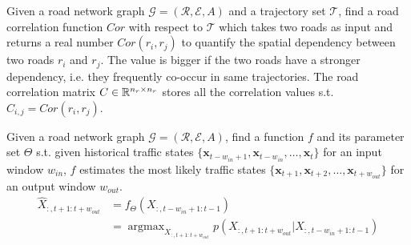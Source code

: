 \begin{problem}
    Given a road network graph $\mathcal{G}=(\mathcal{R}, \mathcal{E}, A)$ and a trajectory set $\mathcal T$, find a road correlation function $Cor$ with respect to $\mathcal{T}$ which takes two roads as input and returns a real number $Cor(r_i, r_j)$ to quantify the spatial dependency between two roads $r_i$ and $r_j$. The value is bigger if the two roads have a stronger dependency, i.e. they frequently co-occur in same trajectories. The road correlation matrix $C\in\mathbb{R}^{n_r\times n_r}$ stores all the correlation values s.t. $C_{i, j}=Cor(r_i, r_j)$.
\end{problem}

\begin{problem}
    Given a road network graph $\mathcal{G}=(\mathcal{R}, \mathcal{E}, A)$, find a function $f$ and its parameter set $\Theta$ s.t. given historical traffic states $\{\mathbf{x}_{t-w_{in}+1}, \mathbf{x}_{t-w_{in}}, \dots, \mathbf{x}_t \}$ for an input window $w_{in}$, $f$ estimates the most likely traffic states $\{\mathbf{x}_{t+1}, \mathbf{x}_{t+2}, \dots, \mathbf{x}_{t+w_{out}} \}$ for an output window $w_{out}$.
    \begin{equation}
        \begin{aligned}
            \hat X_{:, t+1:t+w_{out}}&=f_\Theta(X_{:, t-w_{in}+1:t-1})\\&=\mathop{\arg\max}_{X_{:, t+1:t+w_{out}}} p(X_{:, t+1:t+w_{out}}|X_{:, t-w_{in}+1:t-1})
        \end{aligned}
    \end{equation}
\end{problem}
